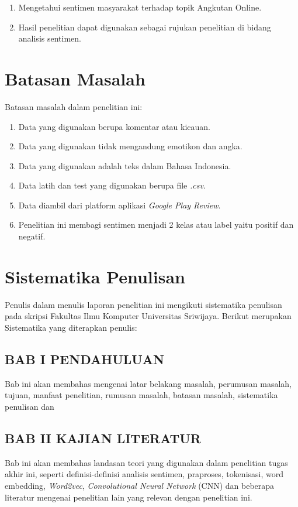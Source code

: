 \begin{enumerate}
    \item Mengetahui sentimen masyarakat terhadap topik Angkutan Online.
    \item Hasil penelitian dapat digunakan sebagai rujukan penelitian di bidang analisis sentimen.
\end{enumerate}

\section{Batasan Masalah}
Batasan masalah dalam penelitian ini:

\begin{enumerate}
    \item Data yang digunakan berupa komentar atau kicauan.
    \item Data yang digunakan tidak mengandung emotikon dan angka.
    \item Data yang digunakan adalah teks dalam Bahasa Indonesia.
    \item Data latih dan test yang digunakan berupa file \emph{.csv}.
    \item Data diambil dari platform aplikasi \emph{Google Play Review}.
    \item Penelitian ini membagi sentimen menjadi 2 kelas atau label yaitu positif dan negatif.
\end{enumerate}

\section{Sistematika Penulisan}
Penulis dalam menulis laporan penelitian ini mengikuti sistematika penulisan pada skripsi
Fakultas Ilmu Komputer Universitas Sriwijaya. Berikut merupakan Sistematika yang diterapkan
penulis:

\subsection{BAB I PENDAHULUAN}
Bab ini akan membahas mengenai latar belakang masalah, perumusan masalah, tujuan,
manfaat penelitian, rumusan masalah, batasan masalah, sistematika penulisan dan

\subsection{BAB II KAJIAN LITERATUR}
Bab ini akan membahas landasan teori yang digunakan dalam penelitian tugas akhir ini,
seperti definisi-definisi analisis sentimen, praproses, tokenisasi, word embedding, \emph{Word2vec},
\emph{Convolutional Neural Network} (CNN) dan beberapa literatur mengenai penelitian lain
yang relevan dengan penelitian ini.

